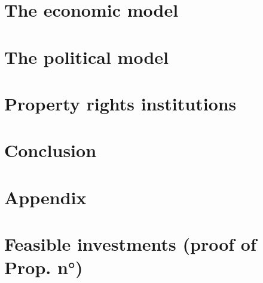 \section{The economic model}

\section{The political model}

\section{Property rights institutions}

\section{Conclusion}


\begin{subappendices}
\section*{Appendix}

\section{Feasible investments (proof of Prop. n°)}


\end{subappendices}